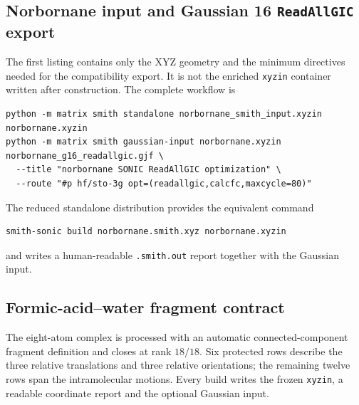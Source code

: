 \documentclass[10pt]{article}
\begin{document}
\subsection{Norbornane input and Gaussian 16 \texttt{ReadAllGIC} export}

The first listing contains only the XYZ geometry and the minimum directives
needed for the compatibility export.  It is not the enriched \texttt{xyzin}
container written after construction.  The complete workflow is

\begin{lstlisting}
python -m matrix smith standalone norbornane_smith_input.xyzin norbornane.xyzin
python -m matrix smith gaussian-input norbornane.xyzin norbornane_g16_readallgic.gjf \
  --title "norbornane SONIC ReadAllGIC optimization" \
  --route "#p hf/sto-3g opt=(readallgic,calcfc,maxcycle=80)"
\end{lstlisting}

The reduced standalone distribution provides the equivalent command
\begin{lstlisting}
smith-sonic build norbornane.smith.xyz norbornane.xyzin
\end{lstlisting}
and writes a human-readable \texttt{.smith.out} report together with the
Gaussian input.





\subsection{Formic-acid--water fragment contract}

The eight-atom complex is processed with an automatic connected-component
fragment definition and closes at rank \(18/18\).  Six protected rows describe
the three relative translations and three relative orientations; the remaining
twelve rows span the intramolecular motions.  Every build writes the frozen
\texttt{xyzin}, a readable coordinate report and the optional Gaussian input.




\end{document}
